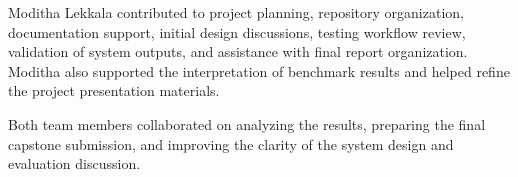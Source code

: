 \documentclass[conference]{IEEEtran}
\begin{document}
\vspace{0.2cm}

Moditha Lekkala contributed to project planning, repository
organization, documentation support, initial design discussions,
testing workflow review, validation of system outputs, and
assistance with final report organization. Moditha also
supported the interpretation of benchmark results and helped
refine the project presentation materials.

\vspace{0.2cm}

Both team members collaborated on analyzing the results,
preparing the final capstone submission, and improving the
clarity of the system design and evaluation discussion.
\end{document}
